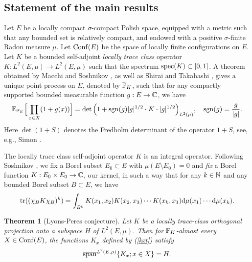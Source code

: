 \documentclass[12pt]{paper}
\newtheorem{theorem}{Theorem}
\numberwithin{theorem}{section}
\numberwithin{figure}{section}
\numberwithin{equation}{section}
\begin{document}
 \subsection{Statement of the main results}
Let $E$ be a locally compact  $\sigma$-compact Polish space, equipped with a metric such that any bounded set is relatively compact, and  endowed with a positive $\sigma$-finite Radon measure $\mu$. Let  $\mathrm{Conf}(E)$ be the space of  locally finite configurations on $E$.
Let $K$ be   a bounded self-adjoint {\it locally trace class} operator $K: L^2(E, \mu)\rightarrow L^2(E, \mu)$ such that the spectrum $\mathrm{spec}(K) \subset [0, 1]$.  A theorem obtained by Macchi \cite{DPP-M} and  Soshnikov \cite{DPP-S}, as well as Shirai and Takahashi  \cite{ShirTaka0}, gives a unique point process on $E$, denoted by  $\mathbb{P}_{K}$, such that  for any compactly supported bounded measurable function $g: E \rightarrow \mathbb{C}$, we have
\begin{align*}
\mathbb{E}_{\mathbb{P}_K} \Big[\prod_{x\in X} (1 + g(x)) \Big]   = \det  \Big( 1 +   \mathrm{sgn}(g)   |g |^{1/2}  \cdot K \cdot |g|^{1/2}\Big)_{L^2(\mu)}, \quad \mathrm{sgn}(g) =\frac{g}{|g|}.
\end{align*}
Here $\det (1 + S)$ denotes the Fredholm determinant of the operator $1+S$, see, e.g., Simon \cite{Simon-det}.

The locally trace class  self-adjoint operator  $K$ is an integral operator. Following Soshnikov \cite{DPP-S}, we  fix  a Borel subset  $E_0\subset E$ with $\mu(E \setminus E_0) =0$  and {\it fix} a Borel function $K: E_0 \times E_0 \rightarrow \mathbb{C}$, our kernel, in such a way that for any $k\in\mathbb{N}$ and any bounded Borel subset $B\subset E$, we have
\begin{align}\label{kernel-ass}
\mathrm{tr} ((\chi_B K \chi_B)^k) = \int_{B^k} K(x_1, x_2) K(x_2, x_3)\cdots K(x_k, x_1) \mathrm{d} \mu(x_1) \cdots \mathrm{d} \mu(x_k).
\end{align}









\begin{theorem}[Lyons-Peres conjecture]\label{mainthm-DT}
Let $K$ be a locally trace-class orthogonal projection onto a subspace  $H$ of $L^2(E,\mu)$.
Then for $\mathbb{P}_K$-almost every $X \in \mathrm{Conf}(E)$, the functions $K_x$ defined by (\ref{kxt}) satisfy
\[
\overline{\mathrm{span}}^{L^2(E, \mu)}  \{K_x; x\in X \}=H.
\]

\end{theorem}
\end{document}
